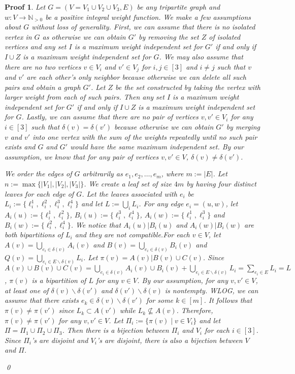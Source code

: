 \documentclass{bmcart}
\theoremstyle{mystyle}
\theoremstyle{proofstyle}
\newtheorem*{proof2}{Proof}
\newenvironment{proofnospace}{\begin{proof2}}{\qed \end{proof2}}
\begin{document}
\thmHardness*
\begin{proofnospace}
  Let $G = (V=V_1 \cup V_2 \cup V_3, E)$ be any tripartite graph and $w:V \to \mathbb{N}_{>0}$ be a positive integral weight function. We make a few assumptions about $G$ without loss of generality. First, we can assume that there is no isolated vertex in $G$ as otherwise we can obtain $G'$ by removing the set $Z$ of isolated vertices and any set $I$ is a maximum weight independent set for $G'$ if and only if $I \cup Z$ is a maximum weight independent set for $G$. We may also assume that there are no two vertices $v \in V_i$ and $v' \in V_j$ for $i,j \in [3]$ and $i \neq j$ such that $v$ and $v'$ are each other's only neighbor because otherwise we can delete all such pairs and obtain a graph $G'$. Let $Z$ be the set constructed by taking the vertex with larger weight from each of such pairs. Then any set $I$ is a maximum weight independent set for $G'$ if and only if $I \cup Z$ is a maximum weight independent set for $G$. Lastly, we can assume that there are no pair of vertices $v,v' \in V_i$ for any $i \in [3]$ such that $\delta(v) = \delta(v')$ because otherwise we can obtain $G'$ by merging $v$ and $v'$ into one vertex with the sum of the weights repeatedly until no such pair exists and $G$ and $G'$ would have the same maximum independent set. By our assumption, we know that for any pair of vertices $v,v'\in V$, $\delta(v) \neq \delta(v')$.
  \smallskip

  We order the edges of $G$ arbitrarily as $e_1,e_2,\dots,e_m$, where $m:=|E|$. Let $n:= \max\{|V_1|,|V_2|,|V_3|\}$. We create a leaf set of size $4m$ by having four distinct leaves for each edge of $G$. Let the leaves associated with $e_i$ be $L_i := \{\ell_i^1,\ell_i^2,\ell_i^3,\ell_i^4\}$ and let $L := \bigcup_i L_i$. For any edge $e_i = (u,w)$, let $A_i(u) := \{\ell_i^1, \ell_i^2\}$, $B_i(u) := \{\ell_i^3, \ell_i^4\}$, $A_i(w) := \{\ell_i^1, \ell_i^3\}$ and $B_i(w) := \{\ell_i^2, \ell_i^4\}$. We notice that $A_i(u)|B_i(u)$ and $A_i(w)|B_i(w)$ are both bipartitions of $L_i$ and they are not compatible.For each $v \in V$, let $A(v) = \bigcup_{e_i \in \delta(v)} A_i(v)$ and $B(v) = \bigcup_{e_i \in \delta(v)} B_i(v)$ and $Q(v) = \bigcup_{e_i \in E\backslash \delta(v)} L_i$. Let $\pi(v) = A(v)|B(v)\cup C(v)$. Since $A(v)\cup B(v) \cup C(v) = \bigcup_{e_i \in \delta(v)} A_i(v) \cup B_i(v) + \bigcup_{e_i \in E\backslash \delta(v)} L_i = \sum_{e_i \in E} L_i = L$, $\pi(v)$ is a bipartition of $L$ for any $v \in V$. By our assumption, for any $v, v' \in V$, at least one of $\delta(v) \backslash \delta(v')$ and $\delta(v') \backslash \delta(v)$ is nontempty. WLOG, we can assume that there exists $e_k \in \delta(v) \backslash \delta(v')$ for some $k \in [m]$. It follows that $\pi(v) \neq \pi(v')$ since $L_k \subset A(v')$ while $L_k \nsubseteq A(v)$. Therefore, $\pi(v) \neq \pi(v')$ for any $v,v' \in V$. Let $\Pi_i := \{\pi(v) \mid v \in V_i\}$ and let $\Pi = \Pi_1 \cup \Pi_2 \cup \Pi_3$. Then there is a bijection between $\Pi_i$ and $V_i$ for each $i \in [3]$. Since $\Pi_i$'s are disjoint and $V_i$'s are disjoint, there is also a bijection between $V$ and $\Pi$.\smallskip
 

\end{proofnospace}
\end{document}
